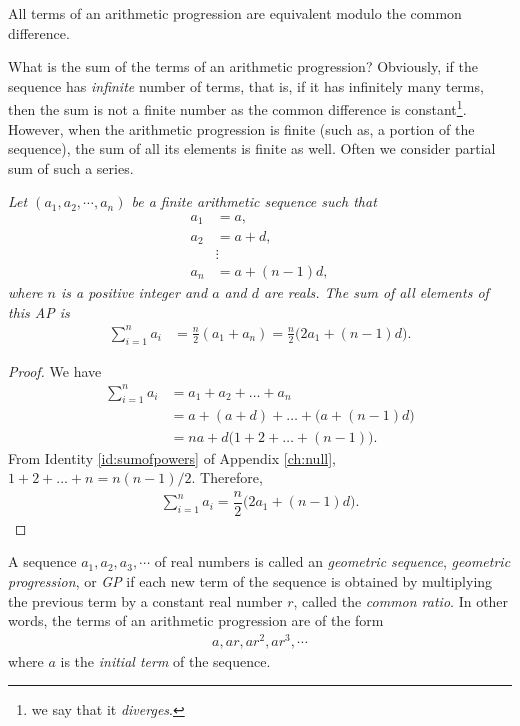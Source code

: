 \documentclass{subfile}
\begin{document}
	\begin{corollary}
		All terms of an arithmetic progression are equivalent modulo the common difference.
	\end{corollary}
What is the sum of the terms of an arithmetic progression? Obviously, if the sequence has \textit{infinite} number of terms, that is, if it has infinitely many terms, then the sum is not a finite number as the common difference is constant\footnote{we say that it \textit{diverges}.}. However, when the arithmetic progression is finite (such as, a portion of the sequence), the sum of all its elements is finite as well. Often we consider partial sum of such a series.
	\begin{theorem}\slshape
		Let $(a_1,a_2,\cdots,a_n)$ be a finite arithmetic sequence such that
			\begin{align*}
				a_1 & = a,\\
				a_2 & = a+d,\\
					& \vdots\\
				a_n & = a+ (n-1)d,
			\end{align*}
		where $n$ is a positive integer and $a$ and $d$ are reals. The sum of all elements of this AP is
			\begin{align*}
				\sum_{i=1}^{n} a_i
					& = \frac{n}{2} \left(a_1+a_n\right) = \frac{n}{2} \big(2a_1 + (n-1)d\big).
			\end{align*}
	\end{theorem}
	
	\begin{proof}
		We have
			\begin{align*}
				\sum_{i=1}^{n} a_i
					&= a_1 + a_2 + \ldots + a_n \\
					&= a + (a+d) + \ldots + \Big(a+ (n-1)d\Big)\\
					&= na + d\Big(1+2+\ldots+ (n-1)\Big).
			\end{align*}
		From Identity \ref{id:sumofpowers} of Appendix \eqref{ch:null}, $1+2+\ldots+n = n(n-1)/2$. Therefore,
			\begin{align*}
				\sum_{i=1}^{n} a_i = \dfrac{n}{2} \big(2a_1 + (n-1)d\big).
			\end{align*}
	\end{proof}
	
	\begin{definition}
		A sequence $a_1, a_2, a_3, \cdots$ of real numbers is called an \textit{geometric sequence}, \textit{geometric progression}, or \textit{GP} if each new term of the sequence is obtained by multiplying the previous term by a constant real number $r$, called the \textit{common ratio}. In other words, the terms of an arithmetic progression are of the form
			\begin{align*}
				a, ar, ar^2, ar^3, \cdots
			\end{align*}
		where $a$ is the \textit{initial term} of the sequence.
	\end{definition}
	
\end{document}
